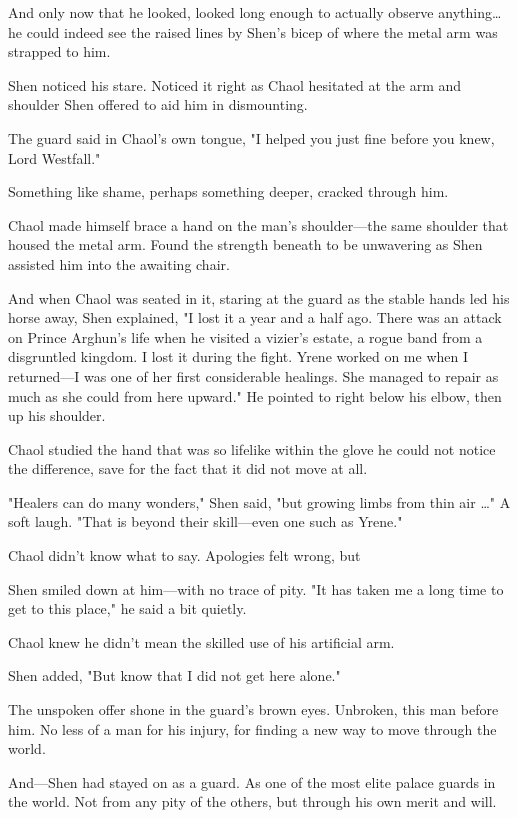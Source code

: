 And only now that he looked, looked long enough to actually observe anything\ldots he could indeed see the raised lines by Shen's bicep of where the metal arm was strapped to him.

Shen noticed his stare.
Noticed it right as Chaol hesitated at the arm and shoulder Shen offered to aid him in dismounting.

The guard said in Chaol's own tongue, "I helped you just fine before you knew, Lord Westfall."

Something like shame, perhaps something deeper, cracked through him.

Chaol made himself brace a hand on the man's shoulder---the same shoulder that housed the metal arm.
Found the strength beneath to be unwavering as Shen assisted him into the awaiting chair.

And when Chaol was seated in it, staring at the guard as the stable hands led his horse away, Shen explained, "I lost it a year and a half ago.
There was an attack on Prince Arghun's life when he visited a vizier's estate, a rogue band from a disgruntled kingdom.
I lost it during the fight.
Yrene worked on me when I returned---I was one of her first considerable healings.
She managed to repair as much as she could from here upward."
He pointed to right below his elbow, then up his shoulder.

Chaol studied the hand that was so lifelike within the glove he could not notice the difference, save for the fact that it did not move at all.

"Healers can do many wonders," Shen said, "but growing limbs from thin air \ldots" A soft laugh.
"That is beyond their skill---even one such as Yrene."

Chaol didn't know what to say.
Apologies felt wrong, but 

Shen smiled down at him---with no trace of pity.
"It has taken me a long time to get to this place," he said a bit quietly.

Chaol knew he didn't mean the skilled use of his artificial arm.

Shen added, "But know that I did not get here alone."

The unspoken offer shone in the guard's brown eyes.
Unbroken, this man before him.
No less of a man for his injury, for finding a new way to move through the world.

And---Shen had stayed on as a guard.
As one of the most elite palace guards in the world.
Not from any pity of the others, but through his own merit and will.

